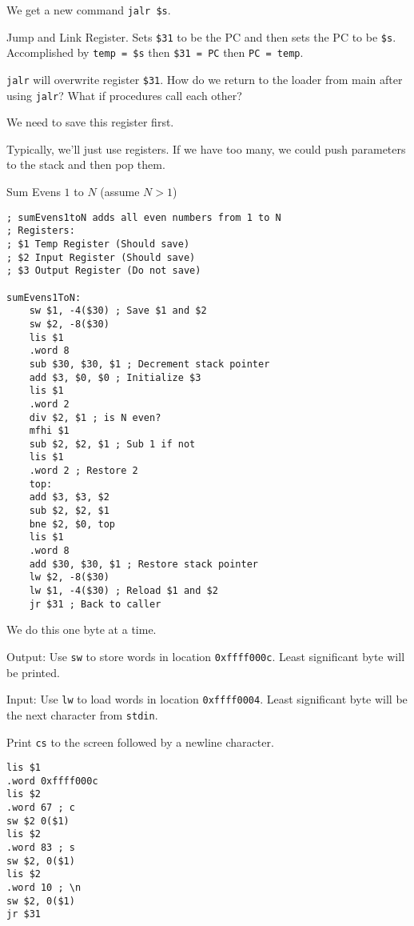 \documentclass{article}
\begin{document}
We get a new command \texttt{jalr\ \$s}.

Jump and Link Register. Sets \texttt{\$31} to be the PC and then sets
the PC to be \texttt{\$s}. Accomplished by \texttt{temp\ =\ \$s} then
\texttt{\$31\ =\ PC} then \texttt{PC\ =\ temp}.

\texttt{jalr} will overwrite register \texttt{\$31}. How do we return to
the loader from main after using \texttt{jalr}? What if procedures call
each other?

We need to save this register first.


Typically, we'll just use registers. If we have too many, we could push
parameters to the stack and then pop them.

Sum Evens \(1\) to \(N\) (assume \(N > 1\))

\begin{tcolorbox}
\begin{verbatim}
; sumEvens1toN adds all even numbers from 1 to N
; Registers:
; $1 Temp Register (Should save)
; $2 Input Register (Should save)
; $3 Output Register (Do not save)

sumEvens1ToN:
    sw $1, -4($30) ; Save $1 and $2
    sw $2, -8($30)
    lis $1
    .word 8
    sub $30, $30, $1 ; Decrement stack pointer
    add $3, $0, $0 ; Initialize $3
    lis $1
    .word 2
    div $2, $1 ; is N even?
    mfhi $1
    sub $2, $2, $1 ; Sub 1 if not
    lis $1
    .word 2 ; Restore 2
    top:
    add $3, $3, $2
    sub $2, $2, $1
    bne $2, $0, top
    lis $1
    .word 8
    add $30, $30, $1 ; Restore stack pointer
    lw $2, -8($30)
    lw $1, -4($30) ; Reload $1 and $2
    jr $31 ; Back to caller
\end{verbatim}
\end{tcolorbox}


We do this one byte at a time.

Output: Use \texttt{sw} to store words in location \texttt{0xffff000c}.
Least significant byte will be printed.

Input: Use \texttt{lw} to load words in location \texttt{0xffff0004}.
Least significant byte will be the next character from \texttt{stdin}.

Print \texttt{cs} to the screen followed by a newline character.

\begin{tcolorbox}
\begin{verbatim}
lis $1
.word 0xffff000c
lis $2
.word 67 ; c
sw $2 0($1)
lis $2
.word 83 ; s
sw $2, 0($1)
lis $2
.word 10 ; \n
sw $2, 0($1)
jr $31
\end{verbatim}
\end{tcolorbox}
\end{document}
